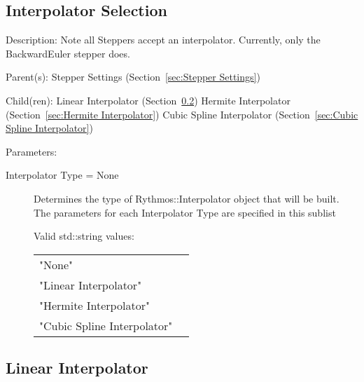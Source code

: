 \subsection{Interpolator Selection}
\label{sec:Interpolator Selection}

\begin{list}{}
  {\setlength{\leftmargin}{1.0in}
   \setlength{\labelwidth}{0.75in}
   \setlength{\labelsep}{0.125in}}
  \item[Description:]
    Note all Steppers accept an interpolator.  Currently, only the BackwardEuler stepper does.
  \item[Parent(s):]
    Stepper Settings (Section~\ref{sec:Stepper Settings})
  \item[Child(ren):]
    Linear Interpolator (Section~\ref{sec:Linear Interpolator})
      \newline 
    Hermite Interpolator (Section~\ref{sec:Hermite Interpolator})
      \newline 
    Cubic Spline Interpolator (Section~\ref{sec:Cubic Spline Interpolator})
  \item[Parameters:]
    \begin{description}
      \item[Interpolator Type = None] 
Determines the type of Rythmos::Interpolator object that will be built.
The parameters for each Interpolator Type are specified in this sublist

  Valid std::string values:

      \begin{tabular}{lp{}}
      "None" & \\ 
      "Linear Interpolator" & \\ 
      "Hermite Interpolator" & \\ 
      "Cubic Spline Interpolator" & \\ 
      \end{tabular}
\end{description}

\end{list}

\subsection{Linear Interpolator}
\label{sec:Linear Interpolator}

